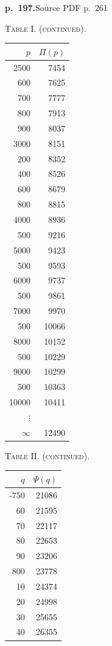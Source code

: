 \documentclass[11pt,a4paper]{article}
\newcommand{\sourcepage}[2]{\par\bigskip\noindent\textbf{p.~#1.}\hfill{\footnotesize Source PDF p.~#2}\par\nobreak\medskip}
\begin{document}
\sourcepage{197}{261}
\begin{center}
\begin{minipage}{0.42\linewidth}
\centering
\textsc{Table I. (continued).}\par
\begin{tabular}{rr}
\toprule
$p$&$\Pi(p)$\\
\midrule
2500&7454\\
600&7625\\
700&7777\\
800&7913\\
900&8037\\
3000&8151\\
200&8352\\
400&8526\\
600&8679\\
800&8815\\
4000&8936\\
500&9216\\
5000&9423\\
500&9593\\
6000&9737\\
500&9861\\
7000&9970\\
500&10066\\
8000&10152\\
500&10229\\
9000&10299\\
500&10363\\
10000&10411\\
$\vdots$&\\
$\infty$&12490\\
\bottomrule
\end{tabular}
\end{minipage}\hfill
\begin{minipage}{0.42\linewidth}
\centering
\textsc{Table II. (continued).}\par
\begin{tabular}{rr}
\toprule
$q$&$\Psi(q)$\\
\midrule
-750&21086\\
60&21595\\
70&22117\\
80&22653\\
90&23206\\
800&23778\\
10&24374\\
20&24998\\
30&25655\\
40&26355\\

\end{tabular}
\end{minipage}
\end{center}
\end{document}
